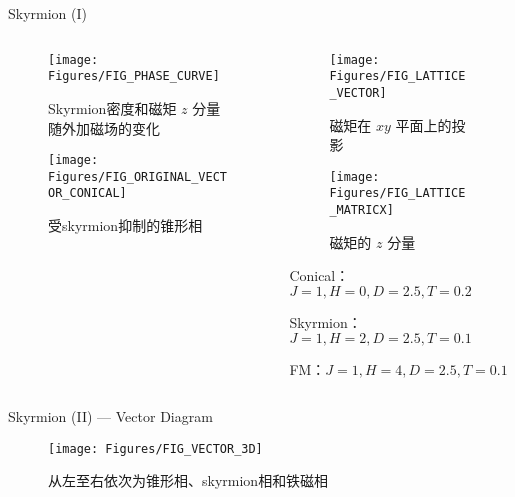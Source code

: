 \documentclass[UTF8, aspectratio = 43]{beamer}
\begin{document}
		\begin{frame}{Skyrmion (I)}
			\begin{columns}
				\begin{column}{0.5\textwidth}
					\begin{figure}
						\texttt{[image: Figures/FIG\_PHASE\_CURVE]}
						\caption{Skyrmion密度和磁矩 $z$ 分量随外加磁场的变化}
					\end{figure} \pause
					\vspace{-1cm}
					\begin{figure}
						\texttt{[image: Figures/FIG\_ORIGINAL\_VECTOR\_CONICAL]}
						\caption{受skyrmion抑制的锥形相}
					\end{figure}
				\end{column} \pause
				\begin{column}{0.5\textwidth}
					\begin{figure}
						\texttt{[image: Figures/FIG\_LATTICE\_VECTOR]}
						\caption{磁矩在 $xy$ 平面上的投影}
					\end{figure}
					\vspace{-1cm}
					\begin{figure}
						\texttt{[image: Figures/FIG\_LATTICE\_MATRICX]}
						\caption{磁矩的 $z$ 分量}
					\end{figure}
					\vspace{-0.8cm}
					\begin{center}
						\tiny
						Conical：$J=1\comma H=0\comma D=2.5\comma T=0.2$
						
						Skyrmion：$J=1\comma H=2\comma D=2.5\comma T=0.1$
						
						FM：$J=1\comma H=4\comma D=2.5\comma T=0.1$
					\end{center}
				\end{column}
			\end{columns}
		\end{frame}
		
		\begin{frame}{Skyrmion (II) --- Vector Diagram}
			\begin{center}
				\begin{figure}
					\texttt{[image: Figures/FIG\_VECTOR\_3D]}
					\caption{从左至右依次为锥形相、skyrmion相和铁磁相}
				\end{figure}
			\end{center}
		\end{frame}
		
\end{document}
